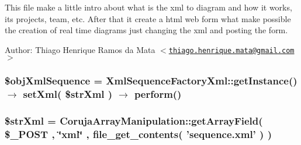 This file make a little intro about what is the xml to diagram and how it works, its projects, team, etc. After that it create a html web form what make possible the creation of real time diagrams just changing the xml and posting the form.

\begin{Desc}
\item[Author:]Thiago Henrique Ramos da Mata $<$\href{mailto:thiago.henrique.mata@gmail.com}{\tt thiago.henrique.mata@gmail.com}$>$ \end{Desc}
\hypertarget{xml_to_diagram_8php_eefa469c1b13fe1fec040c910b720034}{
\subsubsection[{\$objXmlSequence}]{\setlength{\rightskip}{0pt plus 5cm}\$objXmlSequence = XmlSequenceFactoryXml::getInstance() $\rightarrow$ setXml( \$strXml ) $\rightarrow$ perform()}}
\label{xml_to_diagram_8php_eefa469c1b13fe1fec040c910b720034}


\hypertarget{xml_to_diagram_8php_2651e3074f6303e4683f2aff16ec1fbd}{
\subsubsection[{\$strXml}]{\setlength{\rightskip}{0pt plus 5cm}\$strXml = CorujaArrayManipulation::getArrayField( \$\_\-POST , \char`\"{}xml\char`\"{} , file\_\-get\_\-contents( 'sequence.xml' ) )}}
\label{xml_to_diagram_8php_2651e3074f6303e4683f2aff16ec1fbd}


